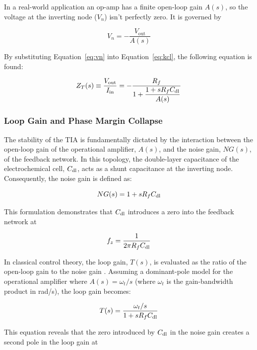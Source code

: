 In a real-world application an op-amp has a finite open-loop gain $A(s)$, so the voltage at the inverting node ($V_n$) isn't perfectly zero. It is governed by
 
\begin{equation}
V_n = -\frac{V_{\text{out}}}{A(s)}
\label{eq:vn}
\end{equation}
 
By substituting Equation~\eqref{eq:vn} into Equation~\eqref{eq:kcl}, the following equation is found:
 
\begin{equation}
Z_T(s) \equiv \frac{V_{\text{out}}}{I_{\text{in}}} = -\frac{R_{f}}{1+\dfrac{1+sR_{f}C_{\mathrm{dl}}}{A(s)}}
\label{eq:zt}
\end{equation}
 
\subsubsection{Loop Gain and Phase Margin Collapse}
\label{sec:tia-loop-gain}
 
The stability of the TIA is fundamentally dictated by the interaction between the open-loop gain of the operational amplifier, $A(s)$, and the noise gain, $NG(s)$, of the feedback network. In this topology, the double-layer capacitance of the electrochemical cell, $C_{\mathrm{dl}}$, acts as a shunt capacitance at the inverting node. Consequently, the noise gain is defined as:
 
\begin{equation}
NG(s) = 1+sR_{f}C_{\mathrm{dl}}
\label{eq:ng}
\end{equation}
 
This formulation demonstrates that $C_{\mathrm{dl}}$ introduces a zero into the feedback network at
 
\begin{equation}
f_z = \frac{1}{2\pi R_{f}C_{\mathrm{dl}}}
\label{eq:fz}
\end{equation}
 
In classical control theory, the loop gain, $T(s)$, is evaluated as the ratio of the open-loop gain to the noise gain \cite{graeme1996photodiode}. Assuming a dominant-pole model for the operational amplifier where $A(s) = \omega_t/s$ (where $\omega_t$ is the gain-bandwidth product in rad/s), the loop gain becomes:
 
\begin{equation}
T(s) = \frac{\omega_t/s}{1+sR_{f}C_{\mathrm{dl}}}
\label{eq:tia_loop_gain}
\end{equation}
 
This equation reveals that the zero introduced by $C_{\mathrm{dl}}$ in the noise gain creates a second pole in the loop gain at
 
